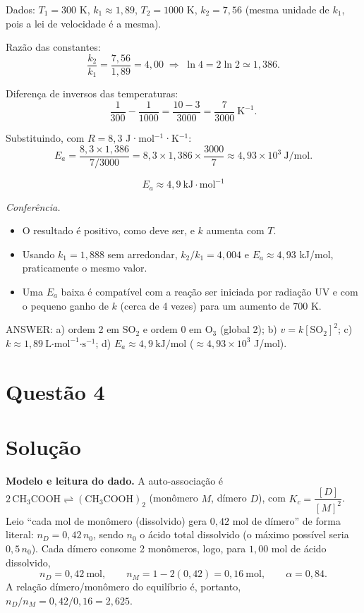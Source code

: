 \documentclass{article}%
\begin{document}
Dados: $T_1=300$ K, $k_1\approx1{,}89$, $T_2=1000$ K, $k_2=7{,}56$ (mesma unidade de $k_1$, pois a lei de velocidade é a mesma).

Razão das constantes:
\[
\frac{k_2}{k_1}=\frac{7{,}56}{1{,}89}=4{,}00
\;\Rightarrow\;
\ln 4 = 2\ln 2 \simeq 1{,}386 .
\]

Diferença de inversos das temperaturas:
\[
\frac{1}{300}-\frac{1}{1000}=\frac{10-3}{3000}=\frac{7}{3000}\ \text{K}^{-1}.
\]

Substituindo, com $R=8{,}3$ J·mol$^{-1}$·K$^{-1}$:
\[
E_a=\frac{8{,}3\times 1{,}386}{7/3000}=8{,}3\times1{,}386\times\frac{3000}{7}\approx 4{,}93\times10^{3}\ \text{J/mol}.
\]

\[
\boxed{E_a \approx 4{,}9\ \text{kJ}\cdot\text{mol}^{-1}}
\]

\emph{Conferência.}
\begin{itemize}
\item O resultado é positivo, como deve ser, e $k$ aumenta com $T$.
\item Usando $k_1=1{,}888$ sem arredondar, $k_2/k_1=4{,}004$ e $E_a\approx 4{,}93$ kJ/mol, praticamente o mesmo valor.
\item Uma $E_a$ baixa é compatível com a reação ser iniciada por radiação UV e com o pequeno ganho de $k$ (cerca de 4 vezes) para um aumento de $700$ K.
\end{itemize}

\medskip
\noindent ANSWER: a) ordem 2 em $\mathrm{SO_2}$ e ordem 0 em $\mathrm{O_3}$ (global 2); b) $v=k[\mathrm{SO_2}]^2$; c) $k\approx1{,}89\ \text{L·mol}^{-1}\text{·s}^{-1}$; d) $E_a\approx4{,}9\ \text{kJ/mol}$ ($\approx 4{,}93\times10^{3}$ J/mol).%
\newpage%
\section*{Questão 4}

\section*{Solução}

\textbf{Modelo e leitura do dado.} A auto-associação é $2\,\mathrm{CH_3COOH}\rightleftharpoons(\mathrm{CH_3COOH})_2$ (monômero $M$, dímero $D$), com $K_c=\dfrac{[D]}{[M]^2}$. Leio ``cada mol de monômero (dissolvido) gera $0{,}42$ mol de dímero'' de forma literal: $n_D=0{,}42\,n_0$, sendo $n_0$ o ácido total dissolvido (o máximo possível seria $0{,}5\,n_0$). Cada dímero consome 2 monômeros, logo, para $1{,}00$ mol de ácido dissolvido,
\[
n_D=0{,}42\ \text{mol},\qquad n_M=1-2(0{,}42)=0{,}16\ \text{mol},\qquad \alpha=0{,}84 .
\]
A relação dímero/monômero do equilíbrio é, portanto, $n_D/n_M=0{,}42/0{,}16=2{,}625$.
\end{document}
